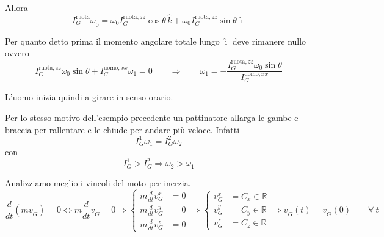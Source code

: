 \begin{example}{}
\begin{center}
\end{center}

Allora
\[
I_G^{\text{ruota}}\underline{\omega}_0=\omega_0 I_G^{\text{ruota},zz}\cos\theta\,\hat{k}+\omega_0 I_G^{\text{ruota},zz}\sin\theta\,\hat{\imath}
\]

Per quanto detto prima il momento angolare totale lungo $\hat{\imath}$ deve rimanere nullo ovvero
\[
I_G^{\text{ruota},zz}\omega_0\sin\theta+I_G^{\text{uomo},xx}\omega_1=0
\qquad\Rightarrow\qquad
\omega_1=-\frac{I_G^{\text{ruota},zz}\omega_0\sin\theta}{I_G^{\text{uomo},xx}}
\]

L'uomo inizia quindi a girare in senso orario.

\end{example}

\begin{example}{}
Per lo stesso motivo dell'esempio precedente un pattinatore allarga le gambe e braccia per rallentare e le chiude per andare più veloce. Infatti
\[
I_G^1 \omega_1 = I_G^2 \omega_2
\]
con
\[
I_G^1 > I_G^2 \Rightarrow \omega_2 > \omega_1
\]
\end{example}

Analizziamo meglio i vincoli del moto per inerzia.
\[
\frac{d}{dt}\left(m\underline{v}_G\right)=0 \Leftrightarrow m\frac{d}{dt}\underline{v}_G=0
\Rightarrow
\left\{
\begin{aligned}
m\frac{d}{dt}v_G^x &= 0\\
m\frac{d}{dt}v_G^y &= 0\\
m\frac{d}{dt}v_G^z &= 0
\end{aligned}
\right.
\Rightarrow
\left\{
\begin{aligned}
v_G^x &= C_x \in \mathbb{R}\\
v_G^y &= C_y \in \mathbb{R}\\
v_G^z &= C_z \in \mathbb{R}
\end{aligned}
\right.
\Rightarrow
\underline{v}_G(t)=\underline{v}_G(0)\qquad \forall\ t
\]

